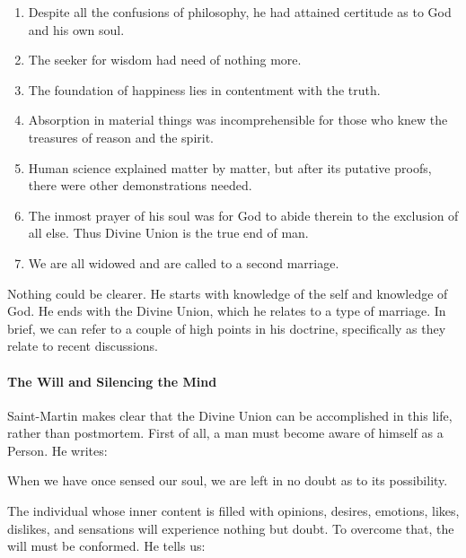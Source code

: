 \begin{enumerate}
\item Despite all the confusions of philosophy, he had attained certitude as to God and his own soul. 
\item The seeker for wisdom had need of nothing more. 
\item The foundation of happiness lies in contentment with the truth. 
\item Absorption in material things was incomprehensible for those who knew the treasures of reason and the spirit. 
\item Human science explained matter by matter, but after its putative proofs, there were other demonstrations needed. 
\item The inmost prayer of his soul was for God to abide therein to the exclusion of all else. Thus Divine Union is the true end of man. 
\item We are all widowed and are called to a second marriage. 
\end{enumerate}
Nothing could be clearer. He starts with knowledge of the self and knowledge of God. He ends with the Divine Union, which he relates to a type of marriage. In brief, we can refer to a couple of high points in his doctrine, specifically as they relate to recent discussions.

\paragraph{The Will and Silencing the Mind}
Saint-Martin makes clear that the Divine Union can be accomplished in this life, rather than postmortem. First of all, a man must become aware of himself as a Person. He writes:

\begin{quotex}
When we have once sensed our soul, we are left in no doubt as to its possibility. 

\end{quotex}
The individual whose inner content is filled with opinions, desires, emotions, likes, dislikes, and sensations will experience nothing but doubt. To overcome that, the will must be conformed. He tells us:

